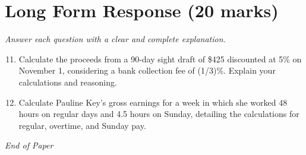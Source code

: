 \documentclass[12pt]{article}
\begin{document}
\section*{Long Form Response (20 marks)}
\textit{Answer each question with a clear and complete explanation.}
\begin{enumerate}[label=\arabic*.]
\setcounter{enumi}{10}
\item Calculate the proceeds from a 90-day sight draft of \$425 discounted at 5\% on November 1, considering a bank collection fee of (1/3)\%. Explain your calculations and reasoning.
\item Calculate Pauline Key's gross earnings for a week in which she worked 48 hours on regular days and 4.5 hours on Sunday, detailing the calculations for regular, overtime, and Sunday pay.
\end{enumerate}

\vfill
\noindent\textit{End of Paper}
\end{document}
